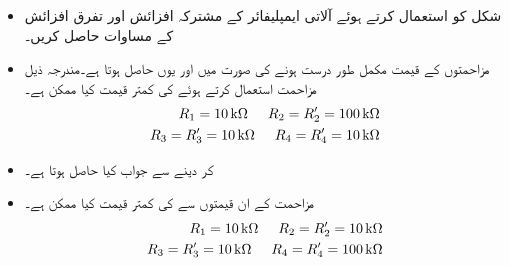 \begin{itemize}
\item
شکل  کو استعمال کرتے ہوئے آلاتی ایمپلیفائر کے مشترکہ افزائش  اور تفرق افزائش  کے مساوات حاصل کریں۔
\item
مزاحمتوں کے قیمت مکمل طور درست ہونے کی صورت میں  اور یوں  حاصل ہوتا ہے۔مندرجہ ذیل  مزاحمت استعمال کرتے ہوئے   کی کمتر قیمت کیا ممکن ہے۔
\begin{align*}
R_1=\SI{10}{\kilo \ohm} \hspace{5mm} R_2=R_2'=\SI{100}{\kilo \ohm}\\
R_3=R_3'=\SI{10}{\kilo \ohm} \hspace{5mm} R_4=R_4'=\SI{10}{\kilo \ohm}
\end{align*}
%
\item
{} کر دینے سے جواب کیا حاصل ہوتا ہے۔
\item
مزاحمت کے ان قیمتوں سے   کی کمتر قیمت کیا ممکن ہے۔
\begin{align*}
R_1=\SI{10}{\kilo \ohm} \hspace{5mm} R_2=R_2'=\SI{10}{\kilo \ohm}\\
R_3=R_3'=\SI{10}{\kilo \ohm} \hspace{5mm} R_4=R_4'=\SI{100}{\kilo \ohm}
\end{align*}

\end{itemize}

